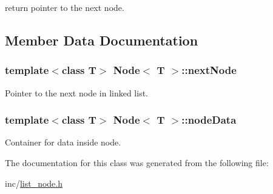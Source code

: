 return pointer to the next node. 

\subsection{Member Data Documentation}
\hypertarget{class_node_a50e5c8a038f32c6dd61a3ba97d5c7ffc}{}
\subsubsection[{next\+Node}]{\setlength{\rightskip}{0pt plus 5cm}template$<$class T$>$ {\bf Node}$<$ T $>$\+::next\+Node\hspace{0.3cm}{\ttfamily [private]}}\label{class_node_a50e5c8a038f32c6dd61a3ba97d5c7ffc}
Pointer to the next node in linked list. \hypertarget{class_node_a16f6a8aec196f06a83ad0d09c4887c25}{}
\subsubsection[{node\+Data}]{\setlength{\rightskip}{0pt plus 5cm}template$<$class T$>$ {\bf Node}$<$ T $>$\+::node\+Data\hspace{0.3cm}{\ttfamily [private]}}\label{class_node_a16f6a8aec196f06a83ad0d09c4887c25}
Container for data inside node. 

The documentation for this class was generated from the following file\+:\begin{DoxyCompactItemize}
\item 
inc/\hyperlink{list__node_8h}{list\+\_\+node.\+h}\end{DoxyCompactItemize}
